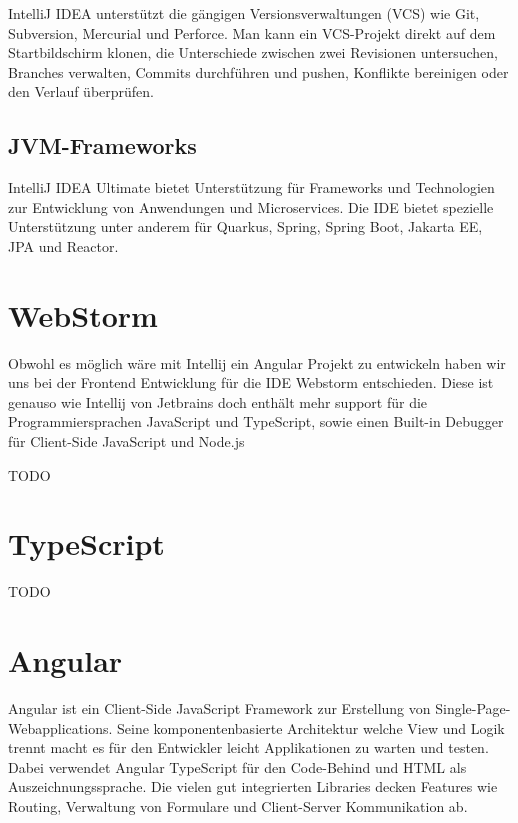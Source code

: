 IntelliJ IDEA unterstützt die gängigen Versionsverwaltungen (VCS) wie Git, Subversion, Mercurial und Perforce. 
Man kann ein VCS-Projekt direkt auf dem Startbildschirm klonen, die Unterschiede zwischen zwei Revisionen untersuchen, Branches verwalten, 
Commits durchführen und pushen, Konflikte bereinigen oder den Verlauf überprüfen. 
\cite{sysarch-intellij-1}


\subsection{JVM-Frameworks}

IntelliJ IDEA Ultimate bietet Unterstützung für Frameworks und Technologien zur Entwicklung von Anwendungen und Microservices. 
Die IDE bietet spezielle Unterstützung unter anderem für Quarkus, Spring, Spring Boot, Jakarta EE, JPA und Reactor.
\cite{sysarch-intellij-1}


\section{WebStorm}


Obwohl es möglich wäre mit Intellij ein Angular Projekt zu entwickeln haben wir uns bei der Frontend Entwicklung 
für die IDE Webstorm entschieden. Diese ist genauso wie Intellij von Jetbrains doch enthält mehr support für die 
Programmiersprachen JavaScript und TypeScript, sowie einen Built-in Debugger für Client-Side JavaScript und Node.js 

TODO

\section{TypeScript}

TODO

\section{Angular}

Angular ist ein Client-Side JavaScript Framework zur Erstellung von Single-Page-Webapplications. 
Seine komponentenbasierte Architektur welche View und Logik trennt macht es für den Entwickler leicht 
Applikationen zu warten und testen. Dabei verwendet Angular TypeScript für den Code-Behind und HTML als Auszeichnungssprache. 
Die vielen gut integrierten Libraries decken Features wie Routing, Verwaltung von Formulare und Client-Server Kommunikation ab. 

